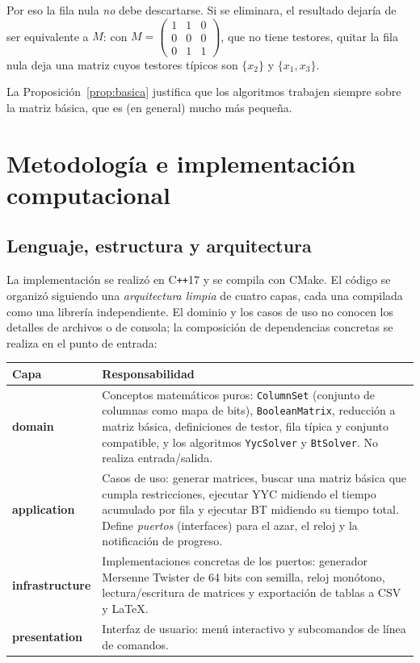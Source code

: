 \documentclass[11pt, a4paper]{article}
\theoremstyle{definition}
\theoremstyle{plain}
\newcommand{\x}[1]{x_{#1}}
\newcommand{\cj}[1]{\{#1\}}
\begin{document}
Por eso la fila nula \emph{no} debe descartarse. Si se eliminara, el resultado
dejaría de ser equivalente a $M$: con
$M=\left(\begin{smallmatrix}1&1&0\\0&0&0\\0&1&1\end{smallmatrix}\right)$, que no
tiene testores, quitar la fila nula deja una matriz cuyos testores típicos son
$\cj{\x2}$ y $\cj{\x1,\x3}$.

La Proposición~\ref{prop:basica} justifica que los algoritmos trabajen
siempre sobre la matriz básica, que es (en general) mucho más pequeña.

\section{Metodología e implementación computacional}

\subsection{Lenguaje, estructura y arquitectura}

La implementación se realizó en C\texttt{++}17 y se compila con CMake. El código
se organizó siguiendo una \emph{arquitectura limpia} de cuatro capas, cada una
compilada como una librería independiente. El dominio y los casos de uso no
conocen los detalles de archivos o de consola; la composición de dependencias
concretas se realiza en el punto de entrada:

\begin{center}
\begin{tabular}{>{\bfseries}l p{11cm}}
\toprule
Capa & Responsabilidad \\
\midrule
domain & Conceptos matemáticos puros: \texttt{ColumnSet} (conjunto de columnas
como mapa de bits), \texttt{BooleanMatrix}, reducción a matriz básica,
definiciones de testor, fila típica y conjunto compatible, y los algoritmos
\texttt{YycSolver} y \texttt{BtSolver}. No realiza entrada/salida. \\
application & Casos de uso: generar matrices, buscar una matriz básica que
cumpla restricciones, ejecutar YYC midiendo el tiempo acumulado por fila y
ejecutar BT midiendo su tiempo total.
Define \emph{puertos} (interfaces) para el azar, el reloj y la notificación
de progreso. \\
infrastructure & Implementaciones concretas de los puertos: generador
Mersenne Twister de 64 bits con semilla, reloj monótono, lectura/escritura de
matrices y exportación de tablas a CSV y \LaTeX. \\
presentation & Interfaz de usuario: menú interactivo y subcomandos de línea
de comandos. \\
\bottomrule
\end{tabular}
\end{center}
\end{document}
